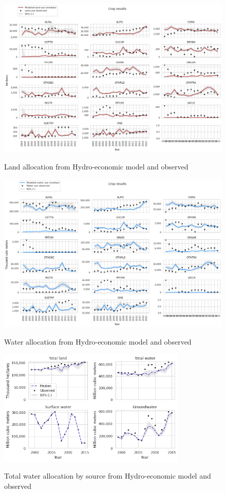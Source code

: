 \documentclass[11pt,a4paper]{article}
\begin{document}
\begin{figure}[H]
\centering
\includegraphics[width=1\textwidth]{land_use.png}
\label{fig:mesh1}
\caption{Land allocation from Hydro-economic model and observed}
\end{figure}

\begin{figure}[H]
\centering
\includegraphics[width=1\textwidth]{water_use.png}
\label{fig:mesh1}
\caption{Water allocation from Hydro-economic model and observed}
\end{figure}

\begin{figure}[H]
\centering
\includegraphics[width=0.8\textwidth]{water_use_by_source.png}
\label{fig:mesh1}
\caption{Total water allocation by source from Hydro-economic model and observed}
\end{figure}
\end{document}
